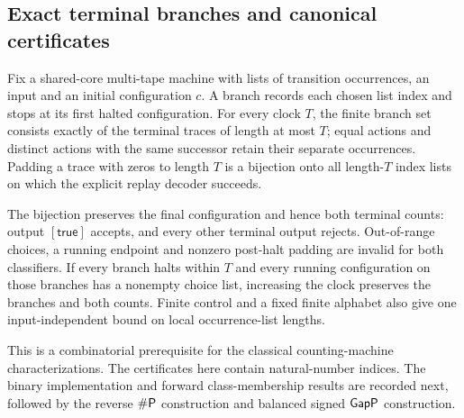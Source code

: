 \begin{result}
\subsection{Exact terminal branches and canonical certificates}
Fix a shared-core multi-tape machine with lists of transition occurrences, an
input and an initial configuration $c$. A branch records each chosen list index
and stops at its first halted configuration. For every clock $T$, the finite
branch set consists exactly of the terminal traces of length at most $T$;
equal actions and distinct actions with the same successor retain their separate
occurrences. Padding a trace with zeros to length $T$ is a bijection onto all
length-$T$ index lists on which the explicit replay decoder succeeds.

The bijection preserves the final configuration and hence both terminal counts:
output $[\mathsf{true}]$ accepts, and every other terminal output rejects.
Out-of-range choices, a running endpoint and nonzero post-halt padding are invalid
for both classifiers. If every branch halts within $T$ and every running
configuration on those branches has a nonempty choice list, increasing the clock
preserves the branches and both counts. Finite control and a fixed finite alphabet
also give one input-independent bound on local occurrence-list lengths.

This is a combinatorial prerequisite for the classical counting-machine
characterizations.\citep{Valiant1979,FennerFortnowKurtz1994}
The certificates here contain natural-number indices. The binary implementation
and forward class-membership results are recorded next, followed by the reverse
$\#\mathsf{P}$ construction and balanced signed $\mathsf{GapP}$ construction.
\end{result}

